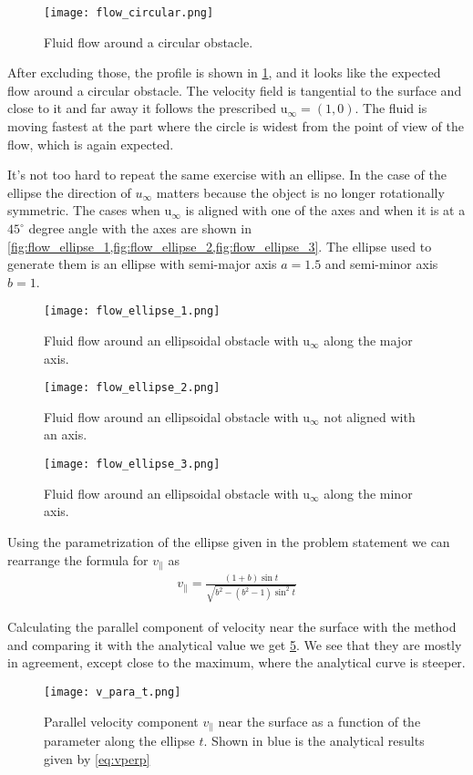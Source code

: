 \documentclass[10pt,a4paper,twocolumn]{article}
\renewcommand{\vec}[1]{\bm{\mathrm{#1}}}
\begin{document}
\begin{figure}[!h]
    \centering
    \texttt{[image: flow\_circular.png]}
    \caption{Fluid flow around a circular obstacle.}
    \label{fig:flow_circular}
\end{figure}

After excluding those, the profile is shown in \cref{fig:flow_circular}, and it looks like the expected flow around a circular obstacle. The velocity field is tangential to the surface and close to it and far away it follows the prescribed $\vec{u}_{\infty} = (1, 0)$. The fluid is moving fastest at the part where the circle is widest from the point of view of the flow, which is again expected.

It's not too hard to repeat the same exercise with an ellipse. In the case of the ellipse the direction of $u_\infty$ matters because the object is no longer rotationally symmetric. The cases when $\vec{u}_\infty$ is aligned with one of the axes and when it is at a $45^{\circ}$ degree angle with the axes are shown in \cref{fig:flow_ellipse_1,fig:flow_ellipse_2,fig:flow_ellipse_3}. The ellipse used to generate them is an ellipse with semi-major axis $a=1.5$ and semi-minor axis $b=1$.

\begin{figure}[!h]
    \centering
    \texttt{[image: flow\_ellipse\_1.png]}
    \caption{Fluid flow around an ellipsoidal obstacle with $\vec{u}_\infty$ along the major axis.}
    \label{fig:flow_ellipse_1}
\end{figure}

\begin{figure}[!h]
    \centering
    \texttt{[image: flow\_ellipse\_2.png]}
    \caption{Fluid flow around an ellipsoidal obstacle with $\vec{u}_\infty$ not aligned with an axis.}
    \label{fig:flow_ellipse_2}
\end{figure}

\begin{figure}[!h]
    \centering
    \texttt{[image: flow\_ellipse\_3.png]}
    \caption{Fluid flow around an ellipsoidal obstacle with $\vec{u}_\infty$ along the minor axis.}
    \label{fig:flow_ellipse_3}
\end{figure}

Using the parametrization of the ellipse given in the problem statement we can rearrange the formula for $v_\parallel$ as
%
\begin{align}\label{eq:vperp}
    v_\parallel = \frac{(1 + b) \sin t}{\sqrt{b^2 - (b^2 - 1) \sin^2 t}}
\end{align}

Calculating the parallel component of velocity near the surface with the method and comparing it with the analytical value we get \cref{fig:vperp}. We see that they are mostly in agreement, except close to the maximum, where the analytical curve is steeper.

\begin{figure}[!t]
    \centering
    \texttt{[image: v\_para\_t.png]}
    \caption{Parallel velocity component $v_{\parallel}$ near the surface as a function of the parameter along the ellipse $t$. Shown in blue is the analytical results given by \cref{eq:vperp}}
    \label{fig:vperp}
\end{figure}
\end{document}
